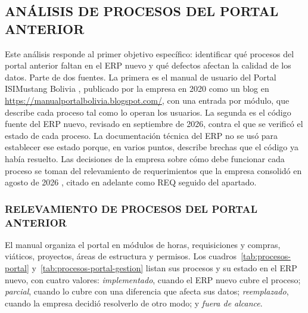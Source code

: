 \subsection{ANÁLISIS DE PROCESOS DEL PORTAL ANTERIOR}

Este análisis responde al primer objetivo específico: identificar qué procesos del portal anterior faltan en el ERP nuevo y qué defectos afectan la calidad de los datos. Parte de dos fuentes. La primera es el manual de usuario del Portal ISIMustang Bolivia \parencite{ISIMustang2020Manual}, publicado por la empresa en 2020 como un blog en \url{https://manualportalbolivia.blogspot.com/}, con una entrada por módulo, que describe cada proceso tal como lo operan los usuarios. La segunda es el código fuente del ERP nuevo, revisado en septiembre de 2026, contra el que se verificó el estado de cada proceso. La documentación técnica del ERP no se usó para establecer ese estado porque, en varios puntos, describe brechas que el código ya había resuelto. Las decisiones de la empresa sobre cómo debe funcionar cada proceso se toman del relevamiento de requerimientos que la empresa consolidó en agosto de 2026 \parencite{ISIMustang2026Requerimientos}, citado en adelante como REQ seguido del apartado.

\subsubsection{RELEVAMIENTO DE PROCESOS DEL PORTAL ANTERIOR}

El manual organiza el portal en módulos de horas, requisiciones y compras, viáticos, proyectos, áreas de estructura y permisos. Los cuadros~\ref{tab:procesos-portal} y~\ref{tab:procesos-portal-gestion} listan sus procesos y su estado en el ERP nuevo, con cuatro valores: \emph{implementado}, cuando el ERP nuevo cubre el proceso; \emph{parcial}, cuando lo cubre con una diferencia que afecta sus datos; \emph{reemplazado}, cuando la empresa decidió resolverlo de otro modo; y \emph{fuera de alcance}.

